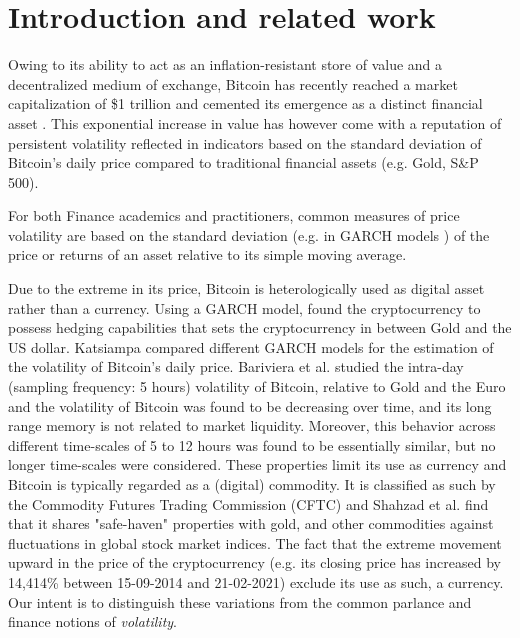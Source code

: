 \documentclass[12pt]{article}
\begin{document}
\section{Introduction and related work}
 Owing to its ability to act as an inflation-resistant store of value  and a decentralized medium of exchange, Bitcoin has recently reached a market capitalization of \$1 trillion \cite{cnbc} and cemented its emergence as a distinct financial asset \cite{krueckeberg}. This exponential increase in value has however come with a reputation of persistent volatility reflected in indicators based on the standard deviation of Bitcoin's daily price compared to traditional financial assets (e.g. Gold, S\&P 500). 
 

For both Finance academics \cite{vol1, vol2} and practitioners\cite{vol3}, common measures of price volatility are based on the standard deviation (e.g. in GARCH models \cite{dyhrberg}) of the price or returns of an asset relative to its simple moving average.
 
 Due to the extreme in its price, Bitcoin is heterologically used as digital asset rather than a currency. Using a GARCH model, \cite{dyhrberg} found the cryptocurrency to possess hedging capabilities that sets the cryptocurrency in between Gold and the US dollar. Katsiampa \cite{katsiampa} compared different GARCH models for the estimation of the volatility of Bitcoin's daily price.  Bariviera et al. \cite{bariviera} studied the intra-day (sampling frequency: 5 hours) volatility of Bitcoin, relative to Gold and the Euro and the volatility of Bitcoin was found to be decreasing over time, and its long range memory is not related to market liquidity. Moreover, this behavior across different time-scales of 5 to 12 hours was found to be essentially similar, but no longer time-scales were considered. 
 These properties limit its use as currency and Bitcoin is typically regarded as a (digital) commodity. It is classified as such by the Commodity Futures Trading Commission (CFTC) \cite{cftc} and Shahzad et al. \cite{shahzad} find that it shares "safe-haven" properties with gold, and other commodities against fluctuations in global stock market indices. The fact that the extreme movement upward in the price of the cryptocurrency (e.g. its closing price has increased by 14,414\% between 15-09-2014 and 21-02-2021) exclude its use as such, a currency. Our intent is to distinguish these variations from the common parlance and finance notions of \textit{volatility}. 
 
\end{document}
